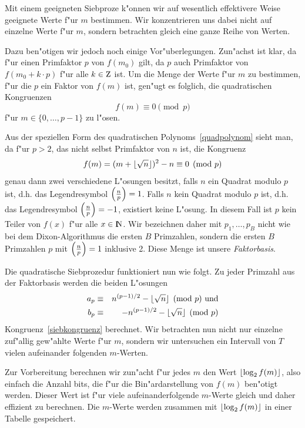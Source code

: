 Mit einem geeigneten Siebproze\3 k"onnen wir auf wesentlich
effektivere Weise geeignete Werte f"ur $m$ bestimmen. Wir
konzentrieren uns dabei nicht auf einzelne Werte f"ur $m$, sondern
betrachten gleich eine ganze Reihe von Werten.

Dazu ben"otigen wir jedoch noch einige Vor"uberlegungen. Zun"achst ist
klar, da\3 f"ur einen Primfaktor $p$ von $f(m_0)$ gilt, da\3 $p$ auch
Primfaktor von $ f(m_0 + k \cdot p) $ f"ur alle $k\in\Z$ ist. Um die
Menge der Werte f"ur $m$ zu bestimmen, f"ur die $p$ ein Faktor von
$f(m)$ ist, gen"ugt es folglich, die quadratischen Kongruenzen
$$ f(m) \equiv 0 \pmod{p} $$
f"ur $m\in\{0,\ldots, p-1\}$ zu l"osen.

Aus der speziellen Form des quadratischen Polynoms~\ref{quadpolynom}
sieht man, da\3 f"ur $p>2$, das nicht selbst Primfaktor von $n$ ist,
die Kongruenz
\begin{equation} 
   f(m) = (m + \lfloor \sqrt{n} \rfloor)^2 - n \equiv 0 \pmod{p} \label{siebkongruenz} 
\end{equation}
genau dann zwei verschiedene L"osungen besitzt, falls $n$ ein Quadrat
modulo $p$ ist, d.h. das Legendresymbol $\left(\frac{n}{p}\right)=1$. Falls $n$ kein
Quadrat modulo $p$ ist, d.h. das Legendresymbol $\left(\frac{n}{p}\right)=-1$,
existiert keine L"osung.  In diesem Fall ist $p$ kein Teiler von
$f(x)$ f"ur alle $x\in\N$. Wir bezeichnen daher mit
$p_1,\ldots,p_B$ nicht wie bei dem Dixon-Algorithmus die ersten $B$
Primzahlen, sondern die ersten $B$ Primzahlen $p$ mit $\left(\frac{n}{p}\right)=1$
inklusive 2. Diese Menge ist unsere {\em Faktorbasis}.

Die quadratische Siebprozedur funktioniert nun wie folgt. Zu jeder
Primzahl aus der Faktorbasis werden die beiden L"osungen 
\begin{eqnarray*}
  a_p & \equiv & n^{(p-1)/2} - \lfloor \sqrt{n} \rfloor \pmod{p} \mbox{ und} \\
  b_p & \equiv & -n^{(p-1)/2} - \lfloor \sqrt{n} \rfloor \pmod{p} 
\end{eqnarray*} 
Kongruenz~\ref{siebkongruenz} berechnet.  Wir betrachten nun nicht nur
einzelne zuf"allig gew"ahlte Werte f"ur $m$, sondern wir untersuchen
ein Intervall von $T$ vielen aufeinander folgenden $m$-Werten.

Zur Vorbereitung berechnen wir zun"acht f"ur jedes $m$ den Wert
$\lfloor \log_2 f(m) \rfloor$, also einfach die Anzahl bits, die f"ur die
Bin"ardarstellung von $f(m)$ ben"otigt werden. Dieser Wert ist f"ur
viele aufeinanderfolgende $m$-Werte gleich und daher effizient zu
berechnen. Die $m$-Werte werden zusammen mit $\lfloor \log_2 f(m) \rfloor$ in
einer Tabelle gespeichert.

